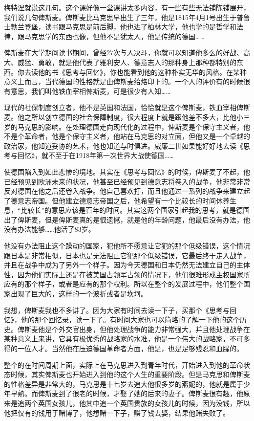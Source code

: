 \documentclass[UTF8, 12pt, a4paper]{ctexrep}
\begin{document}
梅特涅就说这几句。这个课好像一堂课讲太多内容，有一些有些无法铺陈铺展开，我们说几句俾斯麦。俾斯麦比马克思早出生了三年，他是1815年4月1号出生于普鲁士勃兰登堡，读书跟马克思是前后脚，他也进了柏林大学，他也学的是哲学和法律，跟马克思学的东西也像，但他不是犹太人，他是传统的德国……

俾斯麦在大学期间读书期间，曾经27次与人决斗，你就可以知道他多么的好战、高大、威猛、勇敢，就是他代表了雅利安人、德意志人的那种身上那种都特别的东西。你去读他的书《思考与回忆》，你也能看到他的这种朴实无华的风格。在某种意义上而言，当代德国的性格就是由俾斯麦给烙印下的。一个人的评价有的时候很有意思，我们叫他铁血宰相俾斯麦，可是很少有人知……

现代的社保制度创立者，他不是英国和法国，恰恰就是这个俾斯麦，铁血宰相俾斯麦。他之所以创立德国的社会保障制度，很大程度上就是跟他差不多大，比他小三岁的马克思的影响。在处理德国走向现代化的过程中，俾斯麦是个保守主义者，他不是个革命者，他是个保守主义者，他站在马克思的对立面，但他又是一个卓越的政治家，他知道妥协的艺术，他也知道与时俱进。威廉二世如果能好好地去读《思考与回忆》，就不至于在1918年第一次世界大战使德国……

使德国陷入到如此悲惨的境地。其实在《思考与回忆》的时候，俾斯麦了不起，他已经预见到欧洲未来的状况，他甚至已经预见到德意志将卷入的战争，他非常非常反对德国在他之后还卷入战争。他自己喜欢打，而且他通过一系列的战争来建立起了德意志帝国。但他建立德意志帝国之后，他希望有一个比较长的时间休养生息，“比较长”的意思应该是百年的时间。其实这两个国家引起我的思考，就是德国出了俾斯麦，但是俾斯麦真的是很遗憾，就是他的年龄问题，他最后没有办法，他没有办法能够……他活了83岁。

他没有办法阻止这个躁动的国家，犯他所不愿意让它犯的那个低级错误，这个情况跟日本是非常相似，日本也是无法阻止它犯那个低级错误，它最后终于走入战争，并且在战争中成为了另外一个样子。因为今天德国和日本仍然无法建立自己的主体性，因为他们实际上还是在被美国占领军占领的情况下，他们很难形成主权国家所应有的那个样子，或者是应有的那个权利。所以在整个的发展过程中，他们整个国家出现了巨大的，这样的一个波折或者是坎坷。

我想，俾斯麦我也不多讲了。因为大家有时间去读一下子，买那个《思考与回忆》，他的那个回忆录，读一下子。有时间大家也可以简略的了解一下他的这个历史。俾斯麦他是个外交官出身，但他处理战争的能力非常强大，并且他处理战争在某种意义上来讲，它具有极优秀的战略家的水准，他是一个伟大的战略家，不可多得的一位人才。当然他在压迫德国革命者方面，他是，也是足够残忍和血腥的。

整个的在时间周期上面，实际上在马克思进入到青年时代，开始进入到他的革命状态时候，其实俾斯麦也开始进入到他的这个人生的重要阶段。但是马克思和俾斯麦的性格差异是非常大的，马克思是十七岁去追大他很多岁的燕妮的，他就是属于少年早熟。而俾斯麦到了很老的时候，才娶了她的后来的妻子。俾斯麦很有趣，他原来是追两个英国女孩儿，他其中追一个英国贵族的女孩儿的时候，因为没钱，所以他把仅有的钱用于赌博了，他想赌一下子，赚了钱去娶，结果他赌失败了。
\end{document}
